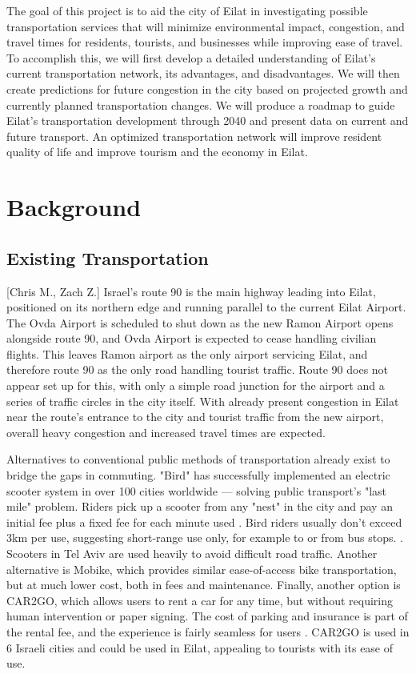 \documentclass[12pt]{article}                         %
\begin{document}
The goal of this project is to aid the city of Eilat in investigating possible transportation services that will minimize environmental impact, congestion, and travel times for residents, tourists, and businesses while improving ease of travel. To accomplish this, we will first develop a detailed understanding of Eilat's current transportation network, its advantages, and disadvantages. We will then create predictions for future congestion in the city based on projected growth and currently planned transportation changes. We will produce a roadmap to guide Eilat's transportation development through 2040 and present data on current and future transport. An optimized transportation network will improve resident quality of life and improve tourism and the economy in Eilat.
 
\newpage
\section{Background}

\subsection{Existing Transportation}[Chris M., Zach Z.]
Israel's route 90 is the main highway leading into Eilat, positioned on its northern edge and running parallel to the current Eilat Airport. The Ovda Airport is scheduled to shut down as the new Ramon Airport opens alongside route 90, and Ovda Airport is expected to cease handling civilian flights. This leaves Ramon airport as the only airport servicing Eilat, and therefore route 90 as the only road handling tourist traffic. Route 90 does not appear set up for this, with only a simple road junction for the airport and a series of traffic circles in the city itself. With already present congestion in Eilat near the route's entrance to the city and tourist traffic from the new airport, overall heavy congestion and increased travel times are expected.

Alternatives to conventional public methods of transportation already exist to bridge the gaps in commuting. "Bird" has successfully implemented an electric scooter system in over 100 cities worldwide --- solving public transport's "last mile" problem. Riders pick up a scooter from any "nest" in the city and pay an initial fee plus a fixed fee for each minute used \cite{MichaelRaz-Chaimovich2018BirdGlobes}. Bird riders usually don't exceed 3km per use, suggesting short-range use only, for example to or from bus stops. \cite{MichaelRaz-Chaimovich2018BirdGlobes}. Scooters in Tel Aviv are used heavily to avoid difficult road traffic. Another alternative is Mobike, which provides similar ease-of-access bike transportation, but at much lower cost, both in fees and maintenance. Finally, another option is CAR2GO, which allows users to rent a car for any time, but without requiring human intervention or paper signing. The cost of parking and insurance is part of the rental fee, and the experience is fairly seamless for users \cite{OrenDoriandMeiravMoran2018IsraeliHaaretz.com}. CAR2GO is used in 6 Israeli cities and could be used in Eilat, appealing to tourists with its ease of use.
\end{document}

